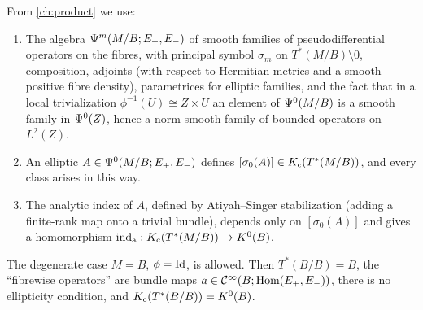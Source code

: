 From \cref{ch:product} we use:
\begin{enumerate}[label=(F\arabic*)]
\item\label{families:F-calculus} The algebra $\Psi^{m}(M/B;E_+,E_-)$ of
  smooth families of pseudodifferential operators on the fibres, with principal
  symbol $\sigma_m$ on $T^*(M/B)\setminus0$, composition, adjoints (with
  respect to Hermitian metrics and a smooth positive fibre density),
  parametrices for elliptic families, and the fact that in a local
  trivialization $\phi^{-1}(U)\cong Z\times U$ an element of $\Psi^{0}(M/B)$
  is a smooth family in $\Psi^{0}(Z)$, hence a norm-smooth family of bounded
  operators on $L^2(Z)$.
\item\label{families:F-symbol} An elliptic $A\in\Psi^{0}(M/B;E_+,E_-)$ defines
  $[\sigma_0(A)]\in K_{\mathrm{c}}(T^*(M/B))$, and every class arises in this way.
\item\label{families:F-index} The analytic index of $A$, defined by Atiyah--Singer stabilization
  (adding a finite-rank map onto a trivial bundle), depends only on $[\sigma_0(A)]$ and gives a
  homomorphism $\operatorname{ind}_{\mathrm{a}}:K_{\mathrm{c}}(T^*(M/B))\to K^0(B)$.
\end{enumerate}
The degenerate case $M=B$, $\phi=\operatorname{Id}$, is allowed. Then $T^*(B/B)=B$, the
``fibrewise operators'' are bundle maps $a\in\mathcal{C}^\infty(B;\operatorname{Hom}(E_+,E_-))$, there is
no ellipticity condition, and $K_{\mathrm{c}}(T^*(B/B))=K^0(B)$.

